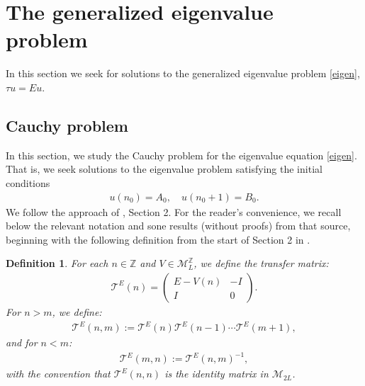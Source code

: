 \documentclass[12pt,oneside,onecolumn,open]{article}
\newtheorem{defi}[teo]{Definition}
\begin{document}
\section{The generalized eigenvalue problem }\label{EP}
In this section we seek for solutions to the generalized eigenvalue problem \eqref{eigen},
$
 \tau u = E u.
$
 
\subsection{Cauchy problem} \label{sectionCP}


In this section, we study the Cauchy problem for the eigenvalue equation \eqref{eigen}. That is, we seek solutions to the eigenvalue problem satisfying the initial conditions
\begin{align} \label{initial}
    u(n_0) = A_0, \quad u(n_0 + 1) = B_0.
\end{align}
We follow the approach of \cite{MR4192212}, Section 2. For the reader's convenience, we recall below the relevant notation and sone results (without proofs) from that source, beginning with the following definition from the start of Section 2 in \cite{MR4192212}.
\begin{defi}\label{transmatrix}
    For each $n \in \mathbb{Z}$ and $V \in \mathcal{M}_L^{\mathbb{Z}}$, we define the transfer matrix:
\begin{align}
    \mathcal{T}^{E}(n) = \begin{pmatrix}
        E - V(n) & -I \\
        I & 0
    \end{pmatrix}.
\end{align}
For $n > m$, we define:
\begin{align}
    \mathcal{T}^{E}(n, m) := \mathcal{T}^{E}(n) \mathcal{T}^{E}(n-1) \cdots \mathcal{T}^{E}(m+1),
\end{align}
and for $n < m$:
\begin{align}\label{TI}
    \mathcal{T}^{E}(m, n) := \mathcal{T}^{E}(n, m)^{-1},
\end{align}
with the convention that $\mathcal{T}^{E}(n, n)$ is the identity matrix in $\mathcal{M}_{2L}$.
\end{defi}
\end{document}
